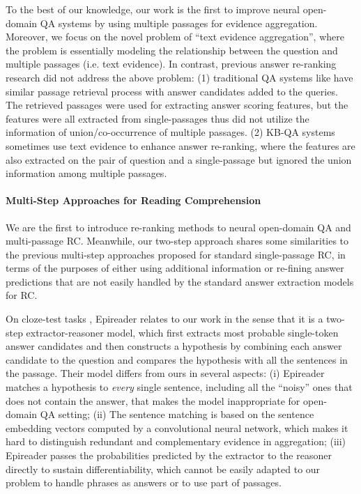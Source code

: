 \documentclass{article} \usepackage{iclr2018_conference,times}
\begin{document}
To the best of our knowledge, our work is the first to improve neural open-domain QA systems by using multiple passages for evidence aggregation.
Moreover, we focus on the novel problem of ``text evidence aggregation'', where the problem is essentially modeling the relationship between the question and multiple passages (i.e. text evidence).
In contrast, previous answer re-ranking research did not address the above problem: (1) traditional QA systems like \citep{ferrucci2010building} have similar passage retrieval process with answer candidates added to the queries. The retrieved passages were used for extracting answer scoring features, but the features were all extracted from single-passages thus did not utilize the information of union/co-occurrence of multiple passages. (2) KB-QA systems \citep{bast2015more,yih-EtAl:2015:ACL-IJCNLP,xu-EtAl:2016:P16-1} sometimes use text evidence to enhance answer re-ranking, where the features are also extracted on the pair of question and a single-passage but ignored the union information among multiple passages.


\paragraph{Multi-Step Approaches for Reading Comprehension}
We are the first to introduce re-ranking methods to neural open-domain QA and multi-passage RC. 
Meanwhile, our two-step approach shares some similarities to the previous multi-step approaches proposed for standard single-passage RC, in terms of the purposes of either using additional information or re-fining answer predictions that are not easily handled by the standard answer extraction models for RC.

On cloze-test tasks \citep{hermann2015teaching},
Epireader \citet{trischler2016natural} relates to our work in the sense that it is a two-step extractor-reasoner model, which first extracts  most probable single-token answer candidates and then constructs a hypothesis by combining each answer candidate to the question and compares the hypothesis with all the sentences in the passage.
Their model differs from ours in several aspects: (i) Epireader matches a hypothesis to \emph{every} single sentence, including all the ``noisy'' ones that does not contain the answer, that makes the model inappropriate for open-domain QA setting; 
(ii) The sentence matching is based on the sentence embedding vectors computed by a convolutional neural network, which makes it hard to distinguish redundant and complementary evidence in aggregation; 
(iii) Epireader passes the probabilities predicted by the extractor to the reasoner directly to sustain differentiability, which cannot be easily adapted to our problem to handle phrases as answers or to use part of passages.
\end{document}
